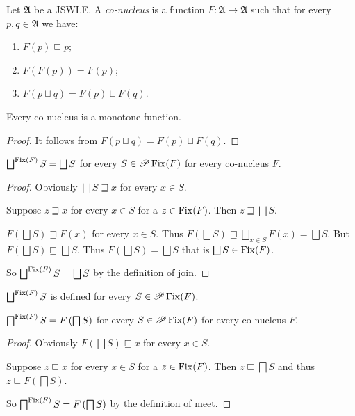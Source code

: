 \begin{defn}
Let $\mathfrak{A}$ be a JSWLE. A \emph{co-nucleus} is a function
$F:\mathfrak{A}\rightarrow\mathfrak{A}$ such that for every $p,q\in\mathfrak{A}$
we have:
\begin{enumerate}
\item \label{co-nucleus-less}$F(p)\sqsubseteq p$;
\item $F(F(p))=F(p)$;
\item $F(p\sqcup q)=F(p)\sqcup F(q)$.
\end{enumerate}
\end{defn}
\begin{prop}
Every co-nucleus is a monotone function.\end{prop}
\begin{proof}
It follows from $F(p\sqcup q)=F(p)\sqcup F(q)$.\end{proof}
\begin{lem}
$\bigsqcup^{\operatorname{Fix}(F)}S=\bigsqcup S$ for every $S\in\mathscr{P}\operatorname{Fix}(F)$
for every co-nucleus $F$.\end{lem}
\begin{proof}
Obviously $\bigsqcup S\sqsupseteq x$ for every $x\in S$.

Suppose $z\sqsupseteq x$ for every $x\in S$ for a $z\in\operatorname{Fix}(F)$.
Then $z\sqsupseteq\bigsqcup S$.

$F\left(\bigsqcup S\right)\sqsupseteq F(x)$ for every $x\in S$.
Thus $F\left(\bigsqcup S\right)\sqsupseteq\bigsqcup_{x\in S}F(x)=\bigsqcup S$.
But $F\left(\bigsqcup S\right)\sqsubseteq\bigsqcup S$. Thus $F\left(\bigsqcup S\right)=\bigsqcup S$
that is $\bigsqcup S\in\operatorname{Fix}(F)$.

So $\bigsqcup^{\operatorname{Fix}(F)}S=\bigsqcup S$ by the definition of join.\end{proof}
\begin{cor}
$\bigsqcup^{\operatorname{Fix}(F)}S$ is defined for every $S\in\mathscr{P}\operatorname{Fix}(F)$.\end{cor}
\begin{lem}
$\bigsqcap^{\operatorname{Fix}(F)}S=F\left(\bigsqcap S\right)$ for every $S\in\mathscr{P}\operatorname{Fix}(F)$
for every co-nucleus $F$.\end{lem}
\begin{proof}
Obviously $F\left(\bigsqcap S\right)\sqsubseteq x$ for every $x\in S$.

Suppose $z\sqsubseteq x$ for every $x\in S$ for a $z\in\operatorname{Fix}(F)$.
Then $z\sqsubseteq\bigsqcap S$ and thus $z\sqsubseteq F\left(\bigsqcap S\right)$.

So $\bigsqcap^{\operatorname{Fix}(F)}S=F\left(\bigsqcap S\right)$ by the definition
of meet.\end{proof}
